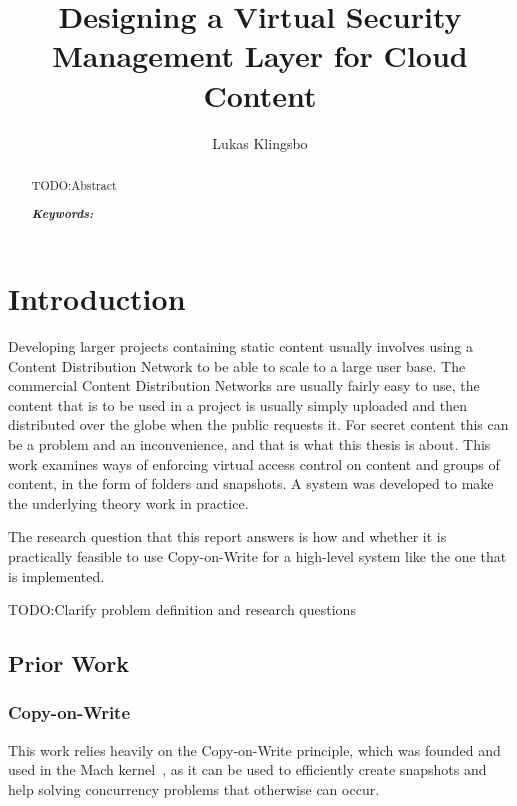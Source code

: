 \documentclass[a4paper,12pt]{article}
\title{\textbf{Designing a Virtual Security Management Layer for Cloud Content}}
\author{Lukas Klingsbo}
\newcommand{\fix}{\colorbox{yellow!30}{TODO:}}
\providecommand{\keywords}[1]{\textbf{\textit{Keywords: }} #1}
\begin{document}
\maketitle
%

\setcounter{page}{1}

%

\begin{abstract}
    \fix Abstract

\keywords{}
\end{abstract}

\newpage\null\thispagestyle{empty}\newpage

\setcounter{tocdepth}{3}
\tableofcontents

\clearpage
{}
\setcounter{page}{1}

\section{Introduction}
Developing larger projects containing static content usually involves using a Content Distribution
Network to be able to scale to a large user base. The commercial Content Distribution Networks are
usually fairly easy to use, the content that is to be used in a project is usually simply uploaded
and then distributed over the globe when the public requests it. For secret content this can be a
problem and an inconvenience, and that is what this thesis is about. This work examines ways of
enforcing virtual access control on content and groups of content, in the form of folders and
snapshots. A system was developed to make the underlying theory work in practice. 

The research question that this report answers is how and whether it is practically feasible to use
Copy-on-Write for a high-level system like the one that is implemented. 

\fix Clarify problem definition and research questions

\subsection{Prior Work}
\subsubsection{Copy-on-Write}
This work relies heavily on the Copy-on-Write principle, which was founded and used in the Mach
kernel~\cite{COPYONWRITE}, as it can be used to efficiently create snapshots and help solving
concurrency problems that otherwise can occur.
\end{document}
